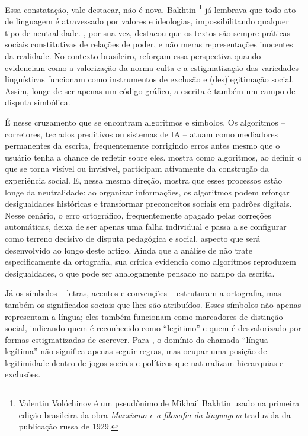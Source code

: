 \documentclass[portuguese]{textolivre}
\begin{document}
Essa constatação, vale destacar, não é nova. Bakhtin \cite{volochinov2017marxismo}\footnote{Valentin Volóchinov é um pseudônimo de Mikhail Bakhtin usado na primeira edição brasileira da obra \textit{Marxismo e a filosofia da linguagem} traduzida da publicação russa de 1929.} já lembrava que todo ato de linguagem é atravessado por valores e ideologias, impossibilitando qualquer tipo de neutralidade. \textcite{fairclough1989language,fairclough2001discurso}, por sua vez, destacou que os textos são sempre práticas sociais constitutivas de relações de poder, e não meras representações inocentes da realidade. No contexto brasileiro, \textcite{bagno1999preconceito,bortoni2004linguamaterna,bortoni2005chegemu} reforçam essa perspectiva quando evidenciam como a valorização da norma culta e a estigmatização das variedades linguísticas funcionam como instrumentos de exclusão e (des)legitimação social. Assim, longe de ser apenas um código gráfico, a escrita é também um campo de disputa simbólica.

É nesse cruzamento que se encontram algoritmos e símbolos. Os algoritmos – corretores, teclados preditivos ou sistemas de IA – atuam como mediadores permanentes da escrita, frequentemente corrigindo erros antes mesmo que o usuário tenha a chance de refletir sobre eles. \textcite{gillespie2014algorithms} mostra como algoritmos, ao definir o que se torna visível ou invisível, participam ativamente da construção da experiência social. E, nessa mesma direção, \textcite{noble2018algorithms} mostra que esses processos estão longe da neutralidade: ao organizar informações, os algoritmos podem reforçar desigualdades históricas e transformar preconceitos sociais em padrões digitais. Nesse cenário, o erro ortográfico, frequentemente apagado pelas correções automáticas, deixa de ser apenas uma falha individual e passa a se configurar como terreno decisivo de disputa pedagógica e social, aspecto que será desenvolvido ao longo deste artigo. Ainda que a análise de \textcite{noble2018algorithms} não trate especificamente da ortografia, sua crítica evidencia como algoritmos reproduzem desigualdades, o que pode ser analogamente pensado no campo da escrita.

Já os símbolos – letras, acentos e convenções – estruturam a ortografia, mas também os significados sociais que lhes são atribuídos. Esses símbolos não apenas representam a língua; eles também funcionam como marcadores de distinção social, indicando quem é reconhecido como “legítimo” e quem é desvalorizado por formas estigmatizadas de escrever. Para \textcite{bourdieu1989poder,bourdieu1991language}, o domínio da chamada “língua legítima” não significa apenas seguir regras, mas ocupar uma posição de legitimidade dentro de jogos sociais e políticos que naturalizam hierarquias e exclusões.
\end{document}
